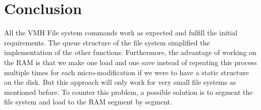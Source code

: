 \chapter{Conclusion}
\label{cp:conclusion}

All the VMH File system commands work as expected and fulfill the initial requirements. The queue structure of the file system simplified the implementation of the other functions. Furthermore, the advantage of working on the RAM is that we make one load and one save instead of repeating this process multiple times for each micro-modification if we were to have a static structure on the disk.
But this approach will only work for very small file systems as mentioned before. To counter this problem, a possible solution is to segment the file system and load to the RAM segment by segment.